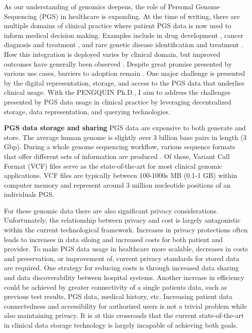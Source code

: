 \documentclass[runningheads]{llncs}
\begin{document}
As our understanding of genomics deepens, the role of Personal Genome Sequencing (PGS) in healthcare is expanding. 
At the time of writing, there are multiple domains of clinical practice where patient PGS data is now used to inform medical decision making. 
Examples include in drug development \cite{ko_new_2022}, cancer diagnosis and treatment \cite{mcleod_cancer_2013}, and rare genetic disease identification and treatment \cite{souche_recommendations_2022}.
How this integration is deployed varies by clinical domain, but improved outcomes have generally been observed \cite{mathur_personalized_2017}.
Despite great promise presented by various use cases, barriers to adoption remain \cite{stefanicka-wojtas_barriers_2023}. 
One major challenge is presented by the digital representation, storage, and access to the PGS data that underlies clinical usage.
With the PENGQUIN Ph.D., I aim to address the challenges presented by PGS data usage in clinical practice by leveraging  decentralized storage, data representation, and querying technologies.  

\textbf{PGS data storage and sharing} 
PGS data are expensive to both generate and store. 
The average human genome is slightly over 3 billion base pairs in length (3 Gbp). 
During a whole genome sequencing workflow, various sequence formats that offer different sets of information are produced \cite{bagger_whole_2024}.
Of these, Variant Call Format (VCF) files \cite{danecek_variant_2011} serve as the state-of-the-art for most clinical genomic applications.
VCF files are typically between 100-1000s MB (0.1-1 GB) within computer memory and represent around 3 million nucleotide positions of an individual\textquotesingle s PGS. 

For these genomic data there are also significant privacy considerations.
Unfortunately, the relationship between privacy and cost is largely antagonistic within the current technological framework.
Increases in privacy protections often leads to increases in data siloing and increased costs for both patient and provider.
To make PGS data usage in healthcare more scalable, decreases in costs and preservation, or improvement of, current privacy standards for stored data are required.
One strategy for reducing costs is through increased data sharing and data discoverability between hospital systems.
Another increase in efficiency could be achieved by greater connectivity of a single patient\textquotesingle s data, such as previous test results, PGS data, medical history, etc.
Increasing patient data connectedness and accessibility for authorized users is not a trivial problem while also maintaining privacy.
It is at this crossroads that the current state-of-the-art in clinical data storage technology is largely incapable of achieving both goals.
\end{document}
